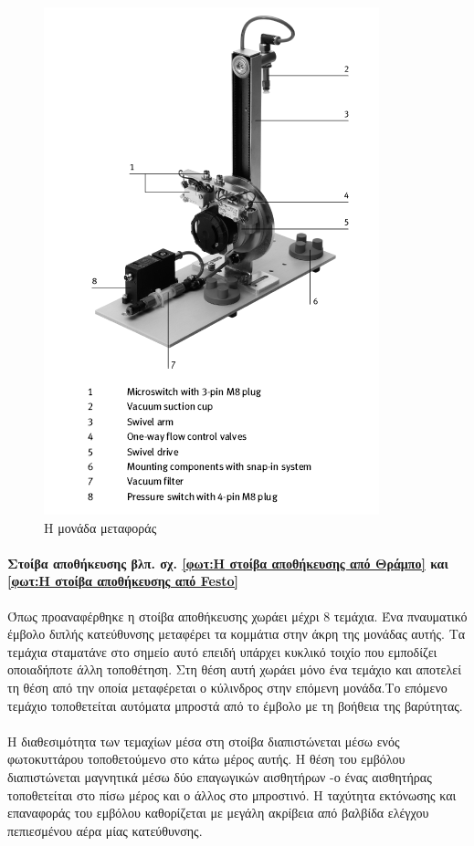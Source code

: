 \documentclass[a4paper,12pt,twoside]{report}
\begin{document}
				\begin{figure}[hp]
					\centering
					\includegraphics[scale=0.75]{ChangerModuleParts.png}
					\caption{Η μονάδα μεταφοράς \cite{FestoChangerModuleManual}}
					\label{φωτ:Η μονάδα μεταφοράς από Festo}
				\end{figure}
							

				
				\paragraph{Στοίβα αποθήκευσης {\footnotesize βλπ. σχ. \ref{φωτ:Η στοίβα αποθήκευσης από Θράμπο} και \ref{φωτ:Η στοίβα αποθήκευσης από Festo}}} {Όπως προαναφέρθηκε η στοίβα αποθήκευσης χωράει μέχρι 8 τεμάχια. Ένα πναυματικό έμβολο διπλής κατεύθυνσης μεταφέρει τα κομμάτια στην άκρη της μονάδας αυτής. Τα τεμάχια σταματάνε στο σημείο αυτό επειδή υπάρχει κυκλικό τοιχίο που εμποδίζει οποιαδήποτε άλλη τοποθέτηση. Στη θέση αυτή χωράει μόνο ένα τεμάχιο και αποτελεί τη θέση από την οποία μεταφέρεται ο κύλινδρος στην επόμενη μονάδα.Το επόμενο τεμάχιο τοποθετείται αυτόματα μπροστά από το έμβολο με τη βοήθεια της βαρύτητας.
				}
				\paragraph{} {Η διαθεσιμότητα των τεμαχίων μέσα στη στοίβα διαπιστώνεται μέσω ενός φωτοκυττάρου τοποθετούμενο στο κάτω μέρος αυτής. Η θέση του εμβόλου διαπιστώνεται μαγνητικά μέσω δύο επαγωγικών αισθητήρων -ο ένας αισθητήρας τοποθετείται στο πίσω μέρος και ο άλλος στο μπροστινό. Η ταχύτητα εκτόνωσης και επαναφοράς του εμβόλου καθορίζεται με μεγάλη ακρίβεια από \gls{βαλβίδα ελέγχου πεπιεσμένου αέρα μίας κατεύθυνσης}.
				}
\end{document}

